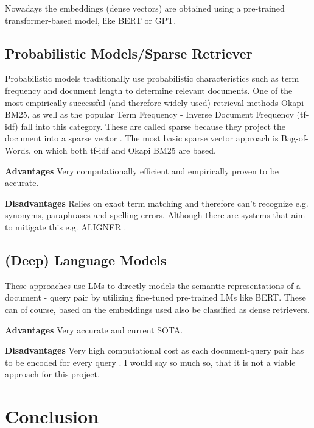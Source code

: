 \documentclass[10pt,twocolumn,letterpaper]{article}
\begin{document}
	Nowadays the embeddings (dense vectors) are obtained using a pre-trained transformer-based model, like BERT or GPT.
	
	\subsection{Probabilistic Models/Sparse Retriever}
	
	Probabilistic models traditionally use probabilistic characteristics such as term frequency and document length to determine relevant documents. One of the most empirically successful (and therefore widely used) retrieval methods Okapi BM25, as well as the popular Term Frequency - Inverse Document Frequency (tf-idf) fall into this category. These are called sparse because they project the document into a sparse vector \citep{zhu2021retrieving}. The most basic sparse vector approach is Bag-of-Words, on which both tf-idf and Okapi BM25 are based.
	
	\textbf{Advantages} Very computationally efficient and empirically proven to be accurate.
	
	\textbf{Disadvantages} Relies on exact term matching and therefore can't recognize e.g. synonyms, paraphrases and spelling errors. Although there are systems that aim to mitigate this e.g. ALIGNER \citep{qian2022multivector}.
	
	\subsection{(Deep) Language Models}
	
	These approaches use LMs to directly models the semantic representations of a document - query pair by utilizing fine-tuned pre-trained LMs like BERT. These can of course, based on the embeddings used also be classified as dense retrievers. \citep{khattab2020colbert}
	
	\textbf{Advantages} Very accurate and current SOTA.
	
	\textbf{Disadvantages} Very high computational cost as each document-query pair has to be encoded for every query \citep{khattab2020colbert}. I would say so much so, that it is not a viable approach for this project.
	
	
	
	
	
	
	
	
	
	
	
	
	
	\section*{Conclusion}


	
	
	
\end{document}
